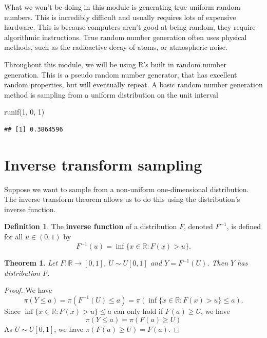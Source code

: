 \documentclass[
]{book}
\newenvironment{Shaded}{\begin{snugshade}}{\end{snugshade}}
\newcommand{\DecValTok}[1]{\textcolor[rgb]{0.00,0.00,0.81}{#1}}
\newcommand{\FunctionTok}[1]{\textcolor[rgb]{0.00,0.00,0.00}{#1}}
\newcommand{\NormalTok}[1]{#1}
\newtheorem{theorem}{Theorem}[chapter]
\theoremstyle{definition}
\newtheorem{definition}{Definition}[chapter]
\theoremstyle{definition}
\theoremstyle{definition}
\theoremstyle{definition}
\theoremstyle{remark}
\begin{document}
What we won't be doing in this module is generating true uniform random numbers. This is incredibly difficult and usually requires lots of expensive hardware. This is because computers aren't good at being random, they require algorithmic instructions. True random number generation often uses physical methods, such as the radioactive decay of atoms, or atmospheric noise.

Throughout this module, we will be using R's built in random number generation. This is a pseudo random number generator, that has excellent random properties, but will eventually repeat. A basic random number generation method is sampling from a uniform distribution on the unit interval

\begin{Shaded}
\begin{Highlighting}[]
\FunctionTok{runif}\NormalTok{(}\DecValTok{1}\NormalTok{, }\DecValTok{0}\NormalTok{, }\DecValTok{1}\NormalTok{)}
\end{Highlighting}
\end{Shaded}

\begin{verbatim}
## [1] 0.3864596
\end{verbatim}

\hypertarget{inverse-transform-sampling}{%
\section{Inverse transform sampling}\label{inverse-transform-sampling}}

Suppose we want to sample from a non-uniform one-dimensional distribution. The inverse transform theorem allows us to do this using the distribution's inverse function.

\begin{definition}
The \textbf{inverse function} of a distribution \(F\), denoted \(F^{-1}\), is defined for all \(u \in (0, 1)\) by
\[
F^{-1}(u) = \inf\{x \in\mathbb{R} : F(x) > u\}.
\]
\end{definition}

\begin{theorem}
Let \(F :\mathbb{R} \rightarrow [0, 1]\), \(U \sim U[0, 1]\) and \(Y = F^{-1}(U)\). Then \(Y\) has distribution \(F\).
\end{theorem}

\begin{proof}
We have
\[
\pi(Y \leq a) = \pi(F^{-1}(U) \leq a) = \pi(\inf\{x \in\mathbb{R} : F(x) > u\} \leq a). 
\]
Since \(\inf\{x \in\mathbb{R} : F(x) > u\} \leq a\) can only hold if \(F(a) \geq U\), we have
\[
\pi(Y \leq a)  = \pi(F(a)\geq U)
\]
As \(U \sim U[0, 1]\), we have \(\pi(F(a)\geq U) = F(a)\).
\end{proof}
\end{document}
